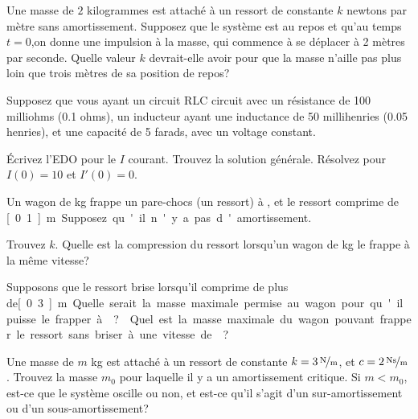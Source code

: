 \setcounter{exercise}{100}

\begin{exercise}
Une masse de $2$ kilogrammes est attaché à un ressort de constante $k$ newtons par
mètre sans amortissement. Supposez que le système est au repos et qu'au temps  $t=0$,on donne une impulsion à la masse, qui  commence à se déplacer à 2 mètres par seconde. Quelle valeur $k$ devrait-elle avoir pour que la masse n'aille pas plus loin que trois mètres de sa position de repos?
\end{exercise}

\begin{exercise}
Supposez que vous ayant un  circuit RLC circuit avec un résistance de 100 milliohms (0.1 ohms),
un inducteur ayant une inductance de 50 millihenries (0.05 henries), et une capacité de 5 farads, avec un voltage constant. 
\begin{tasks}
\task Écrivez l'EDO pour le $I$ courant.
\task Trouvez la solution générale. 
\task Résolvez pour  $I(0) = 10$ et $I'(0) = 0$.
\end{tasks}
\end{exercise}

\begin{exercise}
\pagebreak[2]
Un wagon de  \unit[5000]{kg} frappe un pare-chocs (un ressort) à ,
et le ressort comprime de  \unit[0.1]{m}. Supposez qu'il n'y a pas d'amortissement.  

\begin{tasks}
\task Trouvez $k$.
\task Quelle est la compression du ressort lorsqu'un wagon de \unit[10000]{kg} le frappe à la même vitesse?

\task Supposons que le ressort brise lorsqu'il comprime de plus de\unit[0.3]{m}.  Quelle serait la masse maximale permise au wagon pour qu'il puisse le frapper à  ?
\task Quel est la masse maximale du wagon pouvant frapper le ressort sans briser à une vitesse de ?
\end{tasks}
\end{exercise}

\begin{exercise}
Une masse de $m$ \unit{kg} est attaché à un ressort de constante $k=\unitfrac[3]{N}{m}$, et
$c=\unitfrac[2]{Ns}{m}$.  Trouvez la masse  $m_0$ pour laquelle il y a un amortissement critique. Si $m < m_0$, est-ce que le système oscille ou non, et est-ce qu'il s'agit d'un sur-amortissement ou d'un sous-amortissement? 
\end{exercise}

